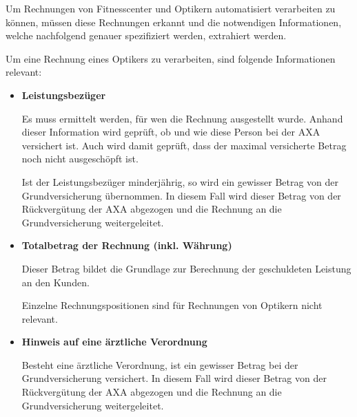 Um Rechnungen von Fitnesscenter und Optikern automatisiert verarbeiten zu können, müssen diese Rechnungen erkannt und die notwendigen Informationen, welche nachfolgend genauer spezifiziert werden, extrahiert werden.

Um eine Rechnung eines Optikers zu verarbeiten, sind folgende Informationen relevant:

\begin{itemize}
    \item \textbf{Leistungsbezüger}
    
    Es muss ermittelt werden, für wen die Rechnung ausgestellt wurde. Anhand dieser Information wird geprüft, ob und wie diese Person bei der AXA versichert ist. Auch wird damit geprüft, dass der maximal versicherte Betrag noch nicht ausgeschöpft ist.
    
    Ist der Leistungsbezüger minderjährig, so wird ein gewisser Betrag von der Grundversicherung übernommen. In diesem Fall wird dieser Betrag von der Rückvergütung der AXA abgezogen und die Rechnung an die Grundversicherung weitergeleitet.
    
    \item \textbf{Totalbetrag der Rechnung (inkl. Währung)}
    
    Dieser Betrag bildet die Grundlage zur Berechnung der geschuldeten Leistung an den Kunden. 
    
    Einzelne Rechnungspositionen sind für Rechnungen von Optikern nicht relevant.
    
    \item \textbf{Hinweis auf eine ärztliche Verordnung}
    
    Besteht eine ärztliche Verordnung, ist ein gewisser Betrag bei der Grundversicherung versichert. In diesem Fall wird dieser Betrag von der Rückvergütung der AXA abgezogen und die Rechnung an die Grundversicherung weitergeleitet.
\end{itemize}



